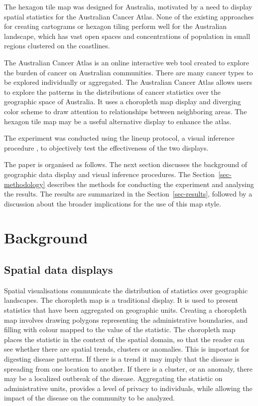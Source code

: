 \documentclass[
doublespace,
  times]{anzsauth}
\begin{document}
The hexagon tile map was designed for Australia, motivated by a need to
display spatial statistics for the Australian Cancer Atlas. None of the
existing approaches for creating cartograms or hexagon tiling perform
well for the Australian landscape, which has vast open spaces and
concentrations of population in small regions clustered on the
coastlines.

The Australian Cancer Atlas \citep{atlas} is an online interactive web
tool created to explore the burden of cancer on Australian communities.
There are many cancer types to be explored individually or aggregated.
The Australian Cancer Atlas allows users to explore the patterns in the
distributions of cancer statistics over the geographic space of
Australia. It uses a choropleth map display and diverging color scheme
to draw attention to relationships between neighboring areas. The
hexagon tile map may be a useful alternative display to enhance the
atlas.

The experiment was conducted using the lineup protocol, a visual
inference procedure \citep{GIIV}, to objectively test the effectiveness
of the two displays.

The paper is organised as follows. The next section discusses the
background of geographic data display and visual inference procedures.
The Section~\ref{sec-methodology} describes the methods for conducting
the experiment and analysing the results. The results are summarized in
the Section~\ref{sec-results}, followed by a discussion about the
broader implications for the use of this map style.

\section{Background}\label{sec-background}

\subsection{Spatial data displays}\label{spatial-data-displays}

Spatial visualisations communicate the distribution of statistics over
geographic landscapes. The choropleth map \citep[\citet{BCM}]{EI} is a
traditional display. It is used to present statistics that have been
aggregated on geographic units. Creating a choropleth map involves
drawing polygons representing the administrative boundaries, and filling
with colour mapped to the value of the statistic. The choropleth map
places the statistic in the context of the spatial domain, so that the
reader can see whether there are spatial trends, clusters or anomalies.
This is important for digesting disease patterns. If there is a trend it
may imply that the disease is spreading from one location to another. If
there is a cluster, or an anomaly, there may be a localized outbreak of
the disease. Aggregating the statistic on administrative units, provides
a level of privacy to individuals, while allowing the impact of the
disease on the community to be analyzed.
\end{document}
